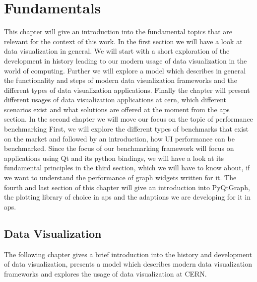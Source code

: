 
\chapter{Fundamentals}
\label{ch:fundamentals}

This chapter will give an introduction into the fundamental topics that are
relevant for the context of this work. In the first section we will have a look
at data visualization in general. We will start with a short exploration of the
development in history leading to our modern usage of data visualization in the
world of computing. Further we will explore a model which describes in general
the functionality and steps of modern data visualization frameworks and the
different types of data visualization applications. Finally the chapter will
present different usages of data visualization applications at \gls{cern}, which
different scenarios exist and what solutions are offered at the moment from the
\gls{aps} section.  In the second chapter we will move our focus on the topic of
performance benchmarking First, we will explore the different types of
benchmarks that exist on the market and followed by an introduction, how UI
performance can be benchmarked.  Since the focus of our benchmarking framework
will focus on applications using Qt and its python bindings, we will have a look
at its fundamental principles in the third section, which we will have to know
about, if we want to understand the performance of graph widgets written for it.
The fourth and last section of this chapter will give an introduction into
PyQtGraph, the plotting library of choice in \gls{aps} and the adaptions we are
developing for it in \gls{aps}.





\section{Data Visualization}
\label{sec:fundamentals:charting}

The following chapter gives a brief introduction into the history and
development of data visualization, presents a model which describes modern data
visualization frameworks and explores the usage of data visualization at CERN.


